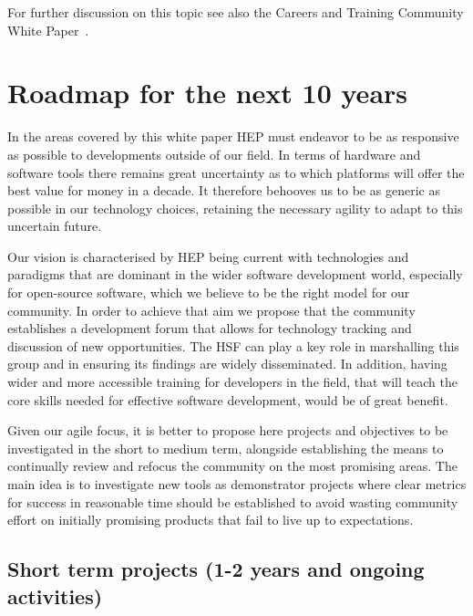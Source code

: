 \documentclass[12pt,a4paper]{article}
\begin{document}
For further discussion on this topic see also the Careers and
Training Community White Paper~\cite{HSF-CWP-2017-02}.

\hypertarget{roadmap-for-the-next-10-years}{%
\section{Roadmap for the next 10
years}\label{roadmap-for-the-next-10-years}}

In the areas covered by this white paper HEP must endeavor to be as
responsive as possible to developments outside of our field. In terms of
hardware and software tools there remains great uncertainty as to which
platforms will offer the best value for money in a decade. It therefore
behooves us to be as generic as possible in our technology choices, retaining
the necessary agility to adapt to this uncertain future.

Our vision is characterised by HEP being current with technologies and
para\-digms that are dominant in the wider software development world,
especially for open-source software, which we believe to be the right
model for our community. In order to achieve that aim we propose that
the community establishes a development forum that allows for technology
tracking and discussion of new opportunities. The HSF can play a key
role in marshalling this group and in ensuring its findings are widely
disseminated. In addition, having wider and more accessible training for
developers in the field, that will teach the core skills needed for
effective software development, would be of great benefit.

Given our agile focus, it is better to propose here projects and
objectives to be investigated in the short to medium term, alongside
establishing the means to continually review and refocus the community
on the most promising areas. The main idea is to investigate new tools
as demonstrator projects where clear metrics for success in reasonable
time should be established to avoid wasting community effort on
initially promising products that fail to live up to expectations.

\hypertarget{short-term-projects-1-2-years-and-ongoing-activities}{%
\subsection{Short term projects (1-2 years and ongoing
activities)}\label{short-term-projects-1-2-years-and-ongoing-activities}}
\end{document}
